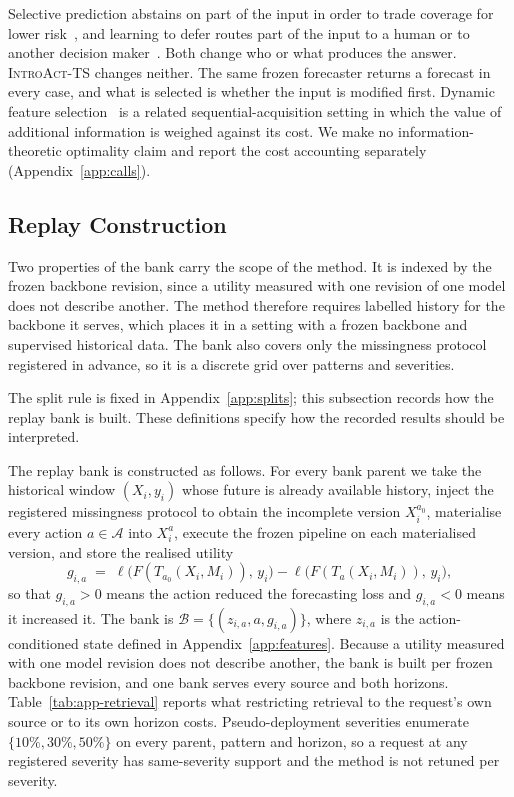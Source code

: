 \documentclass{article}
\newcommand{\introact}{\textsc{IntroAct-TS}}
\newcommand{\calA}{\mathcal{A}}
\newcommand{\calB}{\mathcal{B}}
\newcommand{\loss}{\ell}
\begin{document}
Selective prediction abstains on part of the input in order to trade coverage for lower
risk~\citep{chow1970optimum,vovk2005algorithmic,geifman2017selective,lei2018distribution}, and
learning to defer routes part of the input to a human or to another decision
maker~\citep{madras2018predict,mozannar2020consistent}. Both change who or what produces the
answer. \introact{} changes neither. The same frozen forecaster returns a forecast in every
case, and what is selected is whether the input is modified first. Dynamic feature
selection~\citep{he2024dime} is a related sequential-acquisition setting in which the value of
additional information is weighed against its cost. We make no information-theoretic
optimality claim and report the cost accounting separately (Appendix~\ref{app:calls}).

\subsection{Replay Construction}
\label{app:replay}
Two properties of the bank carry the scope of the method. It is indexed by the frozen backbone
revision, since a utility measured with one revision of one model does not describe another.
The method therefore requires labelled history for the backbone it serves, which places it in
a setting with a frozen backbone and supervised historical data. The bank also
covers only the missingness protocol registered in advance, so it is a discrete grid over
patterns and severities.

The split rule is fixed in Appendix~\ref{app:splits}; this subsection records how the replay bank is built. These definitions specify how the recorded results should be interpreted.

The replay bank is constructed as follows. For every bank parent we take the historical
window $(X_i, y_i)$ whose future is already available history, inject the registered
missingness protocol to obtain the incomplete version $X_i^{a_0}$, materialise every action
$a \in \calA$ into $X_i^{a}$, execute the frozen pipeline on each materialised version, and
store the realised utility
\begin{equation}
  g_{i,a} \;=\; \loss\big(F(T_{a_0}(X_i, M_i)),\, y_i\big) - \loss\big(F(T_{a}(X_i, M_i)),\, y_i\big),
  \label{eq:app-gain}
\end{equation}
so that $g_{i,a} > 0$ means the action reduced the forecasting loss and $g_{i,a} < 0$ means it
increased it. The bank is
$\calB = \{(z_{i,a}, a, g_{i,a})\}$, where $z_{i,a}$ is the action-conditioned state defined
in Appendix~\ref{app:features}. Because a utility measured with one model revision does not describe another, the bank is
built per frozen backbone revision, and one bank serves every source and both horizons.
Table~\ref{tab:app-retrieval} reports what restricting retrieval to the request's own source
or to its own horizon costs. Pseudo-deployment severities enumerate
$\{10\%, 30\%, 50\%\}$ on every parent, pattern and horizon, so a request at any registered
severity has same-severity support and the method is not retuned per severity.
\end{document}
